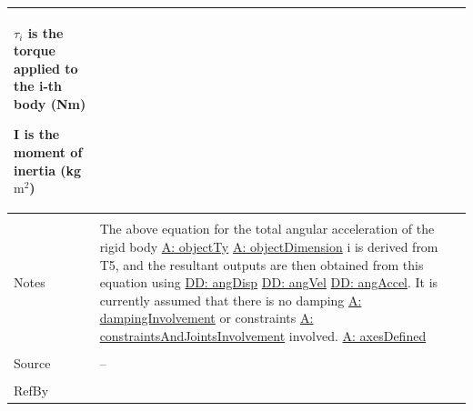 \documentclass[12pt]{article}
\begin{document}
\begin{minipage}{\textwidth}
\begin{tabular}{>{\raggedright}p{}>{\raggedright\arraybackslash}p{}}
\begin{symbDescription}
              \item{${τ_{i}}$ is the torque applied to the i-th body (Nm)}
              \item{$\mathbf{I}$ is the moment of inertia (kg$\text{m}^{2}$)}
              \end{symbDescription}
\\ \midrule \\
Notes & The above equation for the total angular acceleration of the rigid body \hyperref[assumpOT]{A: objectTy} \hyperref[assumpOD]{A: objectDimension} i is derived from T5, and the resultant outputs are then obtained from this equation using \hyperref[DD:angDisp]{DD: angDisp} \hyperref[DD:angVel]{DD: angVel} \hyperref[DD:angAccel]{DD: angAccel}. It is currently assumed that there is no damping \hyperref[assumpDI]{A: dampingInvolvement} or constraints \hyperref[assumpCAJI]{A: constraintsAndJointsInvolvement} involved. \hyperref[assumpAD]{A: axesDefined}
\\ \midrule \\
Source & --
\\ \midrule \\
RefBy & 
\\ \bottomrule
\end{tabular}
\end{minipage}
\par~
\end{document}
